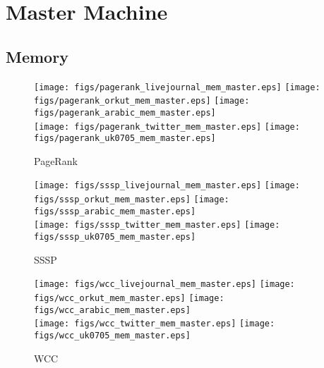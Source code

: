 \documentclass{article}
\newcommand{\bline}[1][1]{\vspace{#1\baselineskip}}
\begin{document}
\pagebreak
\section{Master Machine}
\label{sec:master}
\subsection{Memory}
\begin{figure}[!h]
  \centering
  \texttt{[image: figs/pagerank\_livejournal\_mem\_master.eps]}\hspace{1em}%
  \texttt{[image: figs/pagerank\_orkut\_mem\_master.eps]}\hspace{1em}%
  \texttt{[image: figs/pagerank\_arabic\_mem\_master.eps]}\\
  \texttt{[image: figs/pagerank\_twitter\_mem\_master.eps]}\hspace{1em}%
  \texttt{[image: figs/pagerank\_uk0705\_mem\_master.eps]}
  \caption{PageRank}
\end{figure}

\begin{figure}[!h]
  \bline[3.5]
  \centering
  \texttt{[image: figs/sssp\_livejournal\_mem\_master.eps]}\hspace{1em}%
  \texttt{[image: figs/sssp\_orkut\_mem\_master.eps]}\hspace{1em}%
  \texttt{[image: figs/sssp\_arabic\_mem\_master.eps]}\\
  \texttt{[image: figs/sssp\_twitter\_mem\_master.eps]}\hspace{1em}%
  \texttt{[image: figs/sssp\_uk0705\_mem\_master.eps]}
  \caption{SSSP}
\end{figure}

\begin{figure}[!h]
  \bline[3.5]
  \centering
  \texttt{[image: figs/wcc\_livejournal\_mem\_master.eps]}\hspace{1em}%
  \texttt{[image: figs/wcc\_orkut\_mem\_master.eps]}\hspace{1em}%
  \texttt{[image: figs/wcc\_arabic\_mem\_master.eps]}\\
  \texttt{[image: figs/wcc\_twitter\_mem\_master.eps]}\hspace{1em}%
  \texttt{[image: figs/wcc\_uk0705\_mem\_master.eps]}
  \caption{WCC}
\end{figure}
\end{document}
